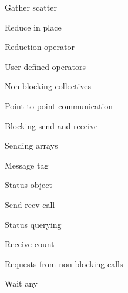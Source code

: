 \documentclass[11pt,headernav]{beamer}
\begin{document}
\begin{frame}[containsverbatim]{Gather scatter}
  
\end{frame}
\begin{frame}[containsverbatim]{Reduce in place}
  \footnotesize
  
\end{frame}
\begin{frame}[containsverbatim]{Reduction operator}
  
\end{frame}
\begin{frame}[containsverbatim]{User defined operators}
  
\end{frame}
\begin{frame}[containsverbatim]{Non-blocking collectives}
  
\end{frame}

 {Point-to-point communication}

\begin{frame}[containsverbatim]{Blocking send and receive}
  
\end{frame}
\begin{frame}[containsverbatim]{Sending arrays}
  
\end{frame}
\begin{frame}[containsverbatim]{Message tag}
  
\end{frame}
\begin{frame}[containsverbatim]{Status object}
  
\end{frame}
\begin{frame}[containsverbatim]{Send-recv call}
  
\end{frame}
\begin{frame}[containsverbatim]{Status querying}
  
\end{frame}

\begin{frame}[containsverbatim]{Receive count}
  
\end{frame}

\begin{frame}[containsverbatim]{Requests from non-blocking calls}
  
\end{frame}
\begin{frame}[containsverbatim]{Wait any}
  
\end{frame}
\end{document}
